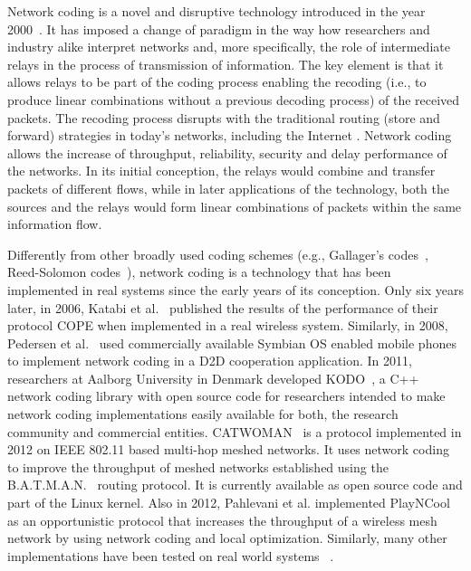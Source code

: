 %

Network coding is a novel and disruptive technology introduced in the year
2000~\cite{ahlswede2000network}. It has imposed a change of paradigm in the way
how researchers and industry alike interpret networks and, more specifically,
the role of intermediate relays in the process of transmission of information.
The key element is that it allows relays to be part of the coding process
enabling the recoding (i.e., to produce linear combinations without a previous
decoding process) of the received packets. The recoding process disrupts with
the traditional routing (store and forward) strategies in today's networks,
including the Internet . Network coding allows the
increase of throughput, reliability, security and delay performance of the
networks. In its initial conception, the relays would combine and transfer
packets of different flows, while in later applications of the technology, both
the sources and the relays would form linear combinations of packets within the
same information flow.

Differently from other broadly used coding schemes (e.g., Gallager's
codes~\cite{gallager1962low}, Reed-Solomon codes~\cite{reed1960polynomial}),
network coding is a technology that has been implemented in real systems since
the early years of its conception. Only six years later, in 2006, Katabi et
al.~\cite{katabi2006practical} published the results of the performance of their
protocol COPE when implemented in a real wireless system. Similarly, in 2008, Pedersen et
al.~\cite{pedersen2008implementation} used commercially available Symbian OS
enabled mobile phones to implement network coding in a \ac{D2D} cooperation
application. In 2011, researchers at Aalborg University in Denmark developed
KODO~\cite{kodo2011pedersen}, a C++ network coding library with open source code
for researchers intended to make network coding implementations easily available
for both, the research community and commercial entities.
CATWOMAN~\cite{hundeboll2012catwoman} is a protocol implemented in 2012 on IEEE
802.11 based multi-hop meshed networks. It uses network coding to improve the
throughput of meshed networks established using the
B.A.T.M.A.N.~\cite{johnson2008simple} routing protocol. It is currently
available as open source code and part of the Linux kernel. Also in 2012,
Pahlevani et al. implemented PlayNCool~\cite{pahlevani2013playncool} as an
opportunistic protocol that increases the throughput of a wireless mesh network
by using network coding and local optimization. Similarly, many other
implementations have been tested on real world systems~
\cite{katti2008xors,krigslund2013core,paramanathan2013leanandmean}.

